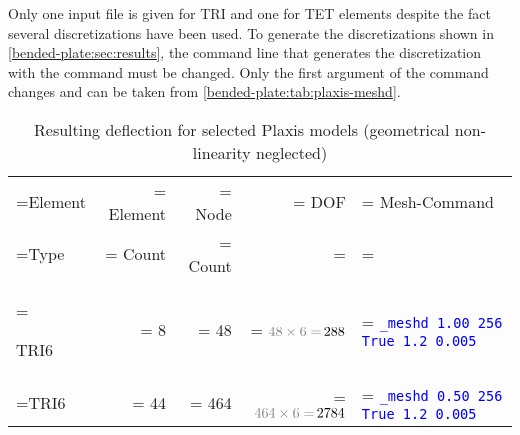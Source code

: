 
Only one input file is given for TRI and one for TET elements despite the fact
several discretizations have been used. To generate the discretizations shown
in \autoref{bended-plate:sec:results}, the command line that generates the
discretization with the  command must be changed. Only the
first argument of the  command changes and can be taken from
\autoref{bended-plate:tab:plaxis-meshd}.

\begin{table}[htbp]
    \centering
    \caption{Resulting deflection for selected Plaxis models (geometrical non-linearity neglected)}
    \label{bended-plate:tab:plaxis-meshd}
    \begin{tabularx}{\textwidth}{
            >{\hsize\linewidth=\hsize}X
            >{\hsize\linewidth=\hsize}R
            >{\hsize\linewidth=\hsize}R
            >{\hsize\linewidth=\hsize}R
            >{\hsize\linewidth=\hsize}Y}

        \hline


        Element                         & Element                                             & Node           & DOF                                        & Mesh-Command \\

        Type                            & Count                                               & Count          &                                            &              \\

        \hline

        TRI6                            & \qty{8}{}                                           & \qty{ 48}{}    & $ \textcolor{gray}{\qty{ 48}{} \times 6 =
        }\,\qty{ 288}{} $               & {\texttt{\textcolor{blue}{\_meshd 1.00 256 True 1.2
        0.005}}}                                                                                                                                                           \\

        TRI6                            & \qty{44}{}                                          & \qty{ 464}{}   & $ \textcolor{gray}{\qty{ 464}{} \times 6 =
        }\,\qty{ 2784}{} $              & {\texttt{\textcolor{blue}{\_meshd 0.50 256 True 1.2
        0.005}}}                                                                                                                                                           \\


\end{tabularx}
\end{table}
